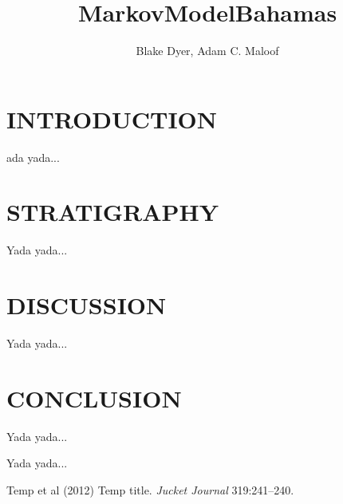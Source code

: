 \documentclass{pnastwo}
\begin{document}
\graphicspath{{images/}}
\title{MarkovModelBahamas}

\author{Blake Dyer,
Adam C. Maloof}



\maketitle

\begin{article}
\begin{abstract}
\end{abstract}



\section{INTRODUCTION}
ada yada...  

\section{STRATIGRAPHY}
Yada yada...

\section{DISCUSSION}
Yada yada...

\section{CONCLUSION}
Yada yada...

\begin{acknowledgments}
Yada yada...
\end{acknowledgments}

\begin{thebibliography}{10}
Temp et al (2012) Temp title.  \textit{Jucket Journal} 319:241--240.
\end{thebibliography}

\end{article}
\end{document}
